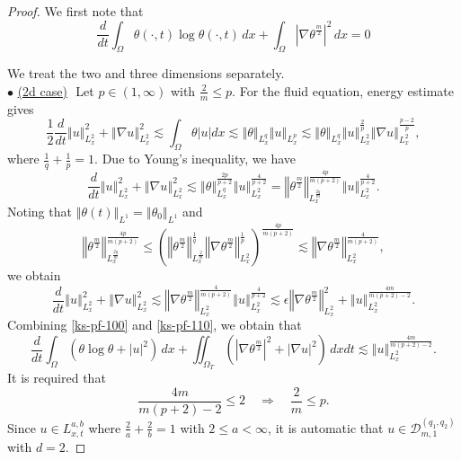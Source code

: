 \documentclass{amsart}
\numberwithin{equation}{section}
\newcommand{\bke}[1]{\left( #1 \right)}
\newcommand{\norm}[1]{\left\Vert #1 \right\Vert}
\newcommand{\abs}[1]{\left| #1 \right|}
\begin{document}
\begin{proof}
We first note that 
\begin{equation}\label{ks-pf-100}
\frac{d}{dt}\int_{\Omega} \theta(\cdot, t)\log \theta(\cdot, t) \,dx+\int_{\Omega} \left|\nabla \theta^{\frac{m}{2}}\right|^{2} \,dx= 0
\end{equation}

We treat the two and three dimensions separately.
\\
$\bullet$ \underline{(2d case)}\,\,
Let $p\in (1, \infty)$ with $\frac{2}{m}\le p$.
For the fluid equation, energy estimate gives
\[
\frac{1}{2}\frac{d}{dt}\norm{u}_{L^{2}_{x}}^2+\norm{\nabla u}_{L^{2}_{x}}^2\lesssim \int_{\Omega}\theta \abs{u}dx\lesssim \norm{\theta}_{L^{q}_{x}}\norm{u}_{L^{p}_{x}} \lesssim \norm{\theta}_{L^{q}_{x}}\norm{u}^{\frac{2}{p}}_{L^{2}_{x}} \norm{\nabla u}^{\frac{p-2}{p}}_{L^{2}_{x}},
\]
where $\frac{1}{q}+ \frac{1}{p}=1$.
Due to Young's inequality, we have
\[
\frac{d}{dt}\norm{u}_{L^{2}_{x}}^2+\norm{\nabla u}_{L^{2}_{x}}^2\lesssim \norm{\theta}^{\frac{2p}{p+2}}_{L^{q}_{x}}\norm{u}^{\frac{4}{p+2}}_{L^{2}_{x}} =\norm{\theta^{\frac{m}{2}}}^{\frac{4p}{m(p+2)}}_{L^{\frac{2q}{m}}_{x}}\norm{u}^{\frac{4}{p+2}}_{L^{2}_{x}}.
\]
Noting that $\norm{\theta(t)}_{L^1}=\norm{\theta_0}_{L^1}$ and
\[
\norm{\theta^{\frac{m}{2}}}^{\frac{4p}{m(p+2)}}_{L^{\frac{2q}{m}}_{x}}\le \bke{\norm{\theta^{\frac{m}{2}}}^{\frac{1}{q}}_{L^{\frac{2}{m}}_{x}}\norm{\nabla \theta^{\frac{m}{2}}}^{\frac{1}{p}}_{L^{2}_{x}}}^{\frac{4p}{m(p+2)}}\lesssim\norm{\nabla \theta^{\frac{m}{2}}}^{\frac{4}{m(p+2)}}_{L^{2}_{x}},
\]
we obtain
\begin{equation}\label{ks-pf-110}
\frac{d}{dt}\norm{u}_{L^{2}_{x}}^2+\norm{\nabla u}_{L^{2}_{x}}^2\lesssim \norm{\nabla \theta^{\frac{m}{2}}}^{\frac{4}{m(p+2)}}_{L^{2}_{x}}\norm{u}^{\frac{4}{p+2}}_{L^{2}_{x}}
\lesssim \epsilon\norm{\nabla \theta^{\frac{m}{2}}}^{2}_{L^{2}_{x}}+\norm{u}^{\frac{4m}{m(p+2)-2}}_{L^{2}_{x}}.
\end{equation}
Combining \eqref{ks-pf-100} and \eqref{ks-pf-110}, we obtain that 
\begin{equation*}
\frac{d}{dt}\int_{\Omega} (\theta \log \theta +\abs{u}^2)\,dx+\iint_{\Omega_T} (\left|\nabla \theta^{\frac{m}{2}}\right|^{2} +\abs{\nabla u}^2) \,dxdt\lesssim \norm{u}^{\frac{4m}{m(p+2)-2}}_{L^{2}_{x}}.
\end{equation*}
It is required that 
\[
\frac{4m}{m(p+2)-2}\le 2 \quad \Longrightarrow \quad \frac{2}{m} \le p.
\]
Since $u\in L^{a, b}_{x,t}$ where $\frac{2}{a}+\frac{2}{b}=1$ with $2\le a<\infty$, it is automatic that $u\in\mathcal{D}_{m,1}^{(q_1, q_2)}$ with $d=2$.

\end{proof}
\end{document}
